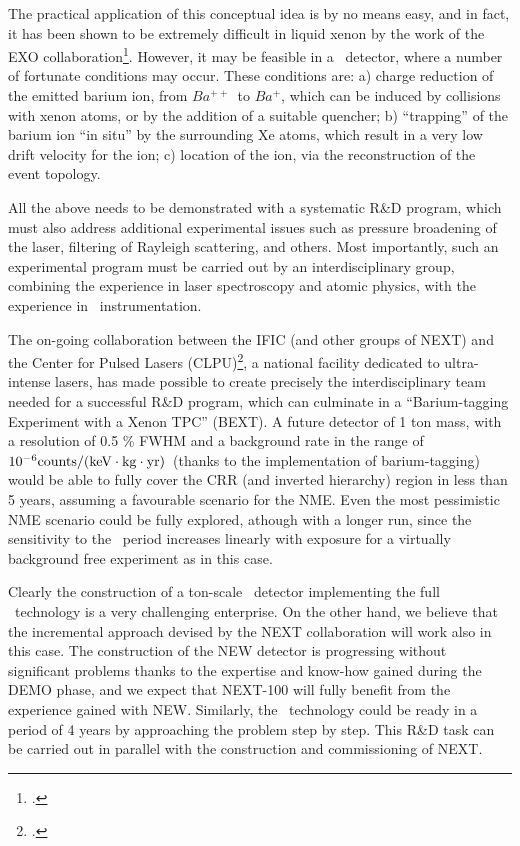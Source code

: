 The practical application of this conceptual idea is by no means easy, and in fact, it has been shown to be extremely difficult in liquid xenon by the work of the EXO collaboration\footcite{Dolinski:2012dta}. However, it may be feasible in a \HPXE\ detector, where a number of fortunate conditions may occur. These conditions are: a) charge reduction of the emitted barium ion, from $Ba^{++}$~to $Ba^{+}$, which can be induced by collisions with xenon atoms, or by the addition of a suitable quencher; b) ``trapping'' of the barium ion ``in situ'' by the surrounding Xe atoms, which result in a very low drift velocity for the ion; c) location of the ion, via the reconstruction of the event topology. 

All the above needs to be demonstrated with a systematic R\&D program, which must also address additional experimental issues such as pressure broadening of the laser, filtering of Rayleigh scattering, and others. Most importantly, such an experimental program must be carried out by an interdisciplinary group, combining the experience in laser spectroscopy and atomic physics, with the experience in \HPXE\ instrumentation.

The on-going collaboration between the IFIC (and other groups of NEXT) and the Center for Pulsed Lasers (CLPU)\footcite{clpu}, a national facility dedicated to ultra-intense lasers, has made possible to create precisely the interdisciplinary team needed for a successful R\&D program, which can culminate in a ``Barium-tagging Experiment with a Xenon TPC'' (BEXT). 
A future detector of 1 ton mass, with a resolution of 0.5 \% FWHM and a background rate in the range of $10^{-6} \rm counts/(keV \cdot kg \cdot yr)$~(thanks to the implementation of barium-tagging) would be able to fully cover the CRR (and inverted hierarchy) region in less than 5 years, assuming a favourable scenario for the NME. Even the most pessimistic NME scenario could be fully explored, athough with a longer run, since the sensitivity to the \bbonu\ period increases linearly with exposure for a virtually background free experiment as in this case. 

Clearly the construction of a ton-scale \HPXE\ detector implementing the full \BATA\ technology is a very challenging enterprise. On the other hand, we believe that the incremental approach devised by the NEXT collaboration will work also in this case. The construction of the NEW detector is progressing without significant problems thanks to the expertise and know-how gained during the DEMO phase, and we expect that NEXT-100 will fully benefit from the experience gained with NEW. Similarly, the \BATA\ technology could be ready in a period of 4 years by approaching the problem step by step. This R\&D task can be carried out in parallel with the construction and commissioning of NEXT.
